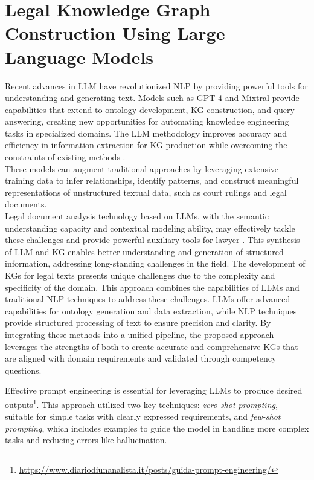 \documentclass[runningheads]{llncs}
\begin{document}
\section{Legal Knowledge Graph Construction Using Large Language Models}
\label{approach-LLM}
Recent advances in LLM have revolutionized NLP by providing powerful tools for understanding and generating text. 
Models such as GPT-4 and Mixtral provide capabilities that extend to ontology development, KG construction, and query answering, creating new opportunities for automating knowledge engineering tasks in specialized domains. 
The LLM methodology improves accuracy and efficiency in information extraction for KG production while overcoming the constraints of existing methods \cite{chen2024information}.\\
These models can augment traditional approaches by leveraging extensive training data to infer relationships, identify patterns, and construct meaningful representations of unstructured textual data, such as court rulings and legal documents.\\
Legal document analysis technology based on LLMs, with the semantic understanding capacity and contextual modeling ability, may effectively tackle these challenges and provide powerful auxiliary tools for lawyer \cite{ammar2024prediction}. This synthesis of LLM and KG enables better understanding and generation of structured information, addressing long-standing challenges in the field.
The development of KGs for legal texts presents unique challenges due to the complexity and specificity of the domain. This approach combines the capabilities of LLMs and traditional NLP techniques to address these challenges. LLMs offer advanced capabilities for ontology generation and data extraction, while NLP techniques provide structured processing of text to ensure precision and clarity. By integrating these methods into a unified pipeline, the proposed approach leverages the strengths of both to create accurate and comprehensive KGs that are aligned with domain requirements and validated through competency questions.

Effective prompt engineering is essential for leveraging LLMs to produce desired outputs\footnote{\url{https://www.diariodiunanalista.it/posts/guida-prompt-engineering/}}. This approach utilized two key techniques: \textit{zero-shot prompting}, suitable for simple tasks with clearly expressed requirements, and \textit{few-shot prompting}, which includes examples to guide the model in handling more complex tasks and reducing errors like hallucination.\\
\end{document}
